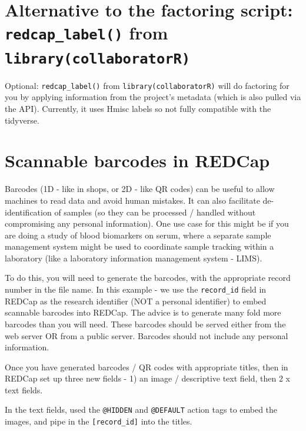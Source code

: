 \documentclass[
]{book}
\begin{document}
\hypertarget{alternative-to-the-factoring-script-redcap_label-from-librarycollaboratorr}{%
\section{\texorpdfstring{Alternative to the factoring script: \texttt{redcap\_label()} from \texttt{library(collaboratorR)}}{Alternative to the factoring script: redcap\_label() from library(collaboratorR)}}\label{alternative-to-the-factoring-script-redcap_label-from-librarycollaboratorr}}

Optional: \texttt{redcap\_label()} from \texttt{library(collaboratorR)} will do factoring for you by applying information from the project's metadata (which is also pulled via the API). Currently, it uses Hmisc labels so not fully compatible with the tidyverse.

\hypertarget{scannable-barcodes-in-redcap}{%
\section{Scannable barcodes in REDCap}\label{scannable-barcodes-in-redcap}}

Barcodes (1D - like in shops, or 2D - like QR codes) can be useful to allow machines to read data and avoid human mistakes. It can also facilitate de-identification of samples (so they can be processed / handled without compromising any personal information). One use case for this might be if you are doing a study of blood biomarkers on serum, where a separate sample management system might be used to coordinate sample tracking within a laboratory (like a laboratory information management system - LIMS).

To do this, you will need to generate the barcodes, with the appropriate record number in the file name. In this example - we use the \texttt{record\_id} field in REDCap as the research identifier (NOT a personal identifier) to embed scannable barcodes into REDCap. The advice is to generate many fold more barcodes than you will need. These barcodes should be served either from the web server OR from a public server. Barcodes should not include any personal information.

Once you have generated barcodes / QR codes with appropriate titles, then in REDCap set up three new fields - 1) an image / descriptive text field, then 2 x text fields.

In the text fields, used the \texttt{@HIDDEN} and \texttt{@DEFAULT} action tags to embed the images, and pipe in the \texttt{{[}record\_id{]}} into the titles.
\end{document}
